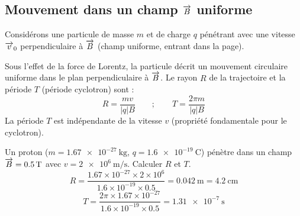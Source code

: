 \subsection{Mouvement dans un champ $\overrightarrow{B}$ uniforme}

Considérons une particule de masse $m$ et de charge $q$ pénétrant avec une vitesse $\overrightarrow{v}_0$ perpendiculaire à $\overrightarrow{B}$ (champ uniforme, entrant dans la page).

\begin{illus}
\end{illus}

\begin{propriete}
Sous l'effet de la force de Lorentz, la particule décrit un mouvement circulaire uniforme dans le plan perpendiculaire à $\overrightarrow{B}$. Le rayon $R$ de la trajectoire et la période $T$ (période cyclotron) sont :
\[
R = \frac{mv}{|q|B} \qquad ; \qquad T = \frac{2\pi m}{|q|B}
\]
La période $T$ est indépendante de la vitesse $v$ (propriété fondamentale pour le cyclotron).
\end{propriete}

\begin{exemple}
Un proton ($m=\SI{1.67e-27}{\kilogram}$, $q=\SI{1.6e-19}{\coulomb}$) pénètre dans un champ $\overrightarrow{B}=\SI{0.5}{\tesla}$ avec $v=\SI{2e6}{\metre\per\second}$. Calculer $R$ et $T$.
\[
R = \frac{1.67\times10^{-27}\times2\times10^{6}}{1.6\times10^{-19}\times0.5} = \SI{0.042}{\metre} = \SI{4.2}{\centi\metre}
\]
\[
T = \frac{2\pi\times1.67\times10^{-27}}{1.6\times10^{-19}\times0.5} = \SI{1.31e-7}{\second}
\]
\end{exemple}

